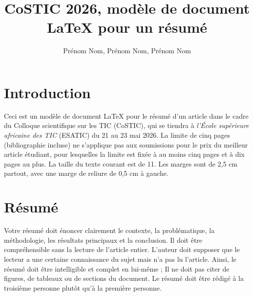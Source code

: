 \documentclass{costic}
\begin{document}
	
	
	\title{CoSTIC 2026, modèle de document \LaTeX{} pour un résumé}
	
	\def\shorttitle{Titre court}
	
	\author{Prénom Nom, Prénom Nom, Prénom Nom}
	
	
	
	
	\maketitle
	\thispagestyle{empty}
	
	
	
	\section{Introduction}
	Ceci est un modèle de document \LaTeX{} pour le résumé d'un article dans le cadre du Colloque scientifique sur les TIC (CoSTIC), qui se tiendra à \textit{l'École supérieure africaine des TIC} (ESATIC) du 21 au 23 mai 2026. La limite de cinq pages (bibliographie incluse) ne s'applique pas aux soumissions pour le prix du meilleur article étudiant, pour lesquelles la limite est fixée à au moins cinq pages et à dix pages au plus. La taille du texte courant est de 11. Les marges sont de 2,5 cm partout, avec une marge de reliure de 0,5 cm à gauche.
	
	\section{Résumé}
	Votre résumé doit énoncer clairement le contexte, la problématique, la méthodologie, les résultats principaux et la conclusion. Il doit être compréhensible sans la lecture de l'article entier. L'auteur doit supposer que le lecteur a une certaine connaissance du sujet mais n'a pas lu l'article. Ainsi, le résumé doit être intelligible et complet en lui-même ; Il ne doit pas citer de figures, de tableaux ou de sections du document. Le résumé doit être rédigé à la troisième personne plutôt qu'à la première personne.
	
\end{document}
